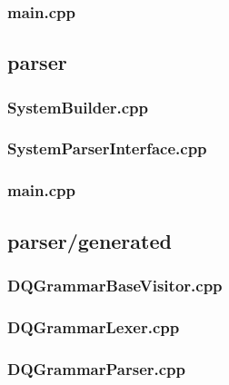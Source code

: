 \subsubsection*{main.cpp}


\subsection*{parser}

\subsubsection*{SystemBuilder.cpp}


\subsubsection*{SystemParserInterface.cpp}


\subsubsection*{main.cpp}


\subsection*{parser/generated}

\subsubsection*{DQGrammarBaseVisitor.cpp}


\subsubsection*{DQGrammarLexer.cpp}


\subsubsection*{DQGrammarParser.cpp}


